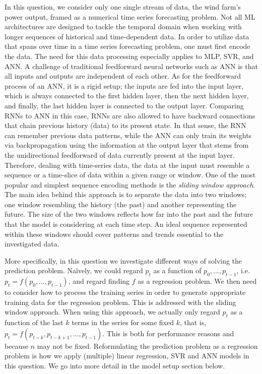 \documentclass[11pt]{article}
\begin{document}
In this question, we consider only one single stream of data, the wind farm's power output, framed as a numerical time series forecasting problem. Not all ML architectures are designed to tackle the temporal domain when working with longer sequences of historical and time-dependent data. In order to utilize data that spans over time in a time series forecasting problem, one must first encode the data. The need for this data processing especially applies to MLP, SVR, and ANN. A challenge of traditional feedforward neural networks such as ANN is that all inputs and outputs are independent of each other. As for the feedforward process of an ANN, it is a rigid setup; the inputs are fed into the input layer, which is always connected to the first hidden layer, then the next hidden layer, and finally, the last hidden layer is connected to the output layer. Comparing RNNs to ANN in this case, RNNs are also allowed to have backward connections that chain previous history (data) to its present state. In that sense, the RNN can remember previous data patterns, while the ANN can only train its weights via backpropagation using the information at the output layer that stems from the unidirectional feedforward of data currently present at the input layer. Therefore, dealing with time-series data, the data at the input must resemble a sequence or a time-slice of data within a given range or window. One of the most popular and simplest sequence encoding methods is the \emph{sliding window approach}. The main idea behind this approach is to separate the data into two windows; one window resembling the history (the past) and another representing the future. The size of the two windows reflects how far into the past and the future that the model is considering at each time step. An ideal sequence represented within these windows should cover patterns and trends essential to the investigated data. 

More specifically, in this question we investigate different ways of solving the prediction problem.
Naïvely, we could regard $p_t$ as a function of $p_0, \dots, p_{t-1}$, i.e.\ $p_t = f(p_0, \dots, p_{t-1})$, and regard finding $f$ as a regression problem.
We then need to consider how to process the training series in order to generate appropriate training data for the regression problem.
This is addressed with the sliding window approach.
When using this approach, we actually only regard $p_t$ as a function of the last $k$ terms in the series for some fixed $k$, that is, $p_t = f(p_{t-k}, p_{t-k+1}, \dots, p_{t-1})$.
This is both for performance reasons and because $n$ may not be fixed.
Reformulating the prediction problem as a regression problem is how we apply (multiple) linear regression, SVR and ANN models in this question.
We go into more detail in the model setup section below.
\end{document}

